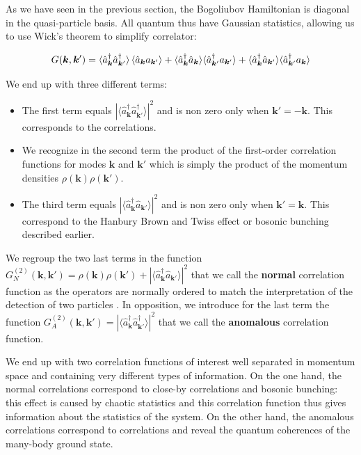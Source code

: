 As we have seen in the previous section, the Bogoliubov Hamiltonian is diagonal in the quasi-particle basis. All quantum thus have Gaussian statistics, allowing us to use Wick's theorem to simplify correlator:

\begin{equation}
    G(\bm{k},\bm{k}')=\langle \hat{a}^{\dagger}_{\bm k} \hat{a}^{\dagger}_{\bm {k}'} \rangle \left\langle\hat{a}_{\bm k} a_{\bm {k}'}\right\rangle + \langle \hat{a}^{\dagger}_{\bm k} \hat{a}_{\bm k} \rangle \langle \hat{a}^{\dagger}_{\bm {k}'} a_{\bm {k}'} \rangle + \langle \hat{a}^{\dagger}_{\bm k} \hat{a}_{\bm {k}'} \rangle \langle \hat{a}^{\dagger}_{\bm {k}'} a_{\bm k} \rangle
\end{equation}

We end up with three different terms:

\begin{itemize}
    \item The first term equals $| \langle \hat{a}^{\dagger}_{\bm k} \hat{a}^{\dagger}_{\bm {k}'} \rangle |^2$ and is non zero only when $\bm{k}'=-\bm{k}$. This corresponds to the \kmk correlations.
    \item We recognize in the second term the product of the first-order correlation functions for modes $\bm{k}$ and $\bm{k}'$ which is simply the product of the momentum densities $\rho(\bm{k}) \rho(\bm{k}')$.
    \item The third term equals $| \langle \hat{a}^{\dagger}_{\bm k} \hat{a}_{\bm {k}'} \rangle |^2$ and is non zero only when $\bm{k}'=\bm{k}$. This correspond to the Hanbury Brown and Twiss effect or bosonic bunching described earlier.
\end{itemize}

We regroup the two last terms in the function $G^{(2)}_{N}({\bm k},{\bm k}')= \rho({\bm k})\rho({\bm k}') + | \langle \hat{a}^{\dagger}_{\bm k} \hat{a}_{\bm {k}'} \rangle |^2$ that we call the \textbf{normal} correlation function as the operators are normally ordered to match the interpretation of the detection of two particles . In opposition, we introduce for the last term the function $G^{(2)}_{A}({\bm k},{\bm k}')=| \langle \hat{a}^{\dagger}_{\bm k} \hat{a}^{\dagger}_{\bm {k}'} \rangle |^2 $ that we call the \textbf{anomalous} correlation function. 

We end up with two correlation functions of interest well separated in momentum space and containing very different types of information. On the one hand, the normal correlations correspond to close-by correlations and bosonic bunching: this effect is caused by chaotic statistics and this correlation function thus gives information about the statistics of the system. On the other hand, the anomalous correlations correspond to \kmk correlations and reveal the quantum coherences of the many-body ground state.

